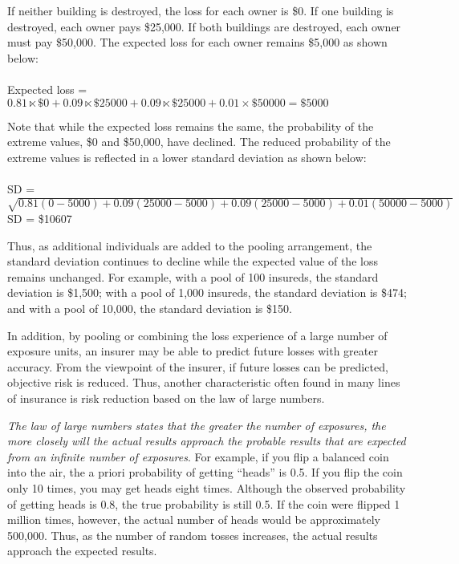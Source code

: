 If neither building is destroyed, the loss for each owner is \$0. If one building is destroyed, each owner pays \$25,000. If both buildings are destroyed, each owner must pay \$50,000. The expected loss for each owner remains \$5,000 as shown below:\\\\
Expected loss = $ 0.81 \ltimes \$0 + 0.09 \ltimes \$25000 + 0.09 \ltimes \$25000 + 0.01 \times \$50000 = \$5000$\\
\par
Note that while the expected loss remains the same, the probability of the extreme values, \$0 and \$50,000, have declined. The reduced probability of the extreme values is reflected in a lower standard deviation as shown below:\\\\
SD = $ \sqrt{0.81(0 - 5000) + 0.09(25000 - 5000) + 0.09(25000 - 5000) + 0.01(50000 -5000)}$\\
SD = \$10607\\
\par
Thus, as additional individuals are added to the pooling arrangement, the standard deviation continues to decline while the expected value of the loss remains unchanged. For example, with a pool of 100 insureds, the standard deviation is \$1,500; with a pool of 1,000 insureds, the standard deviation is \$474; and with a pool of 10,000, the standard deviation is \$150.\\
\par
In addition, by pooling or combining the loss experience of a large number of exposure units, an insurer may be able to predict future losses with greater accuracy. From the viewpoint of the insurer, if future losses can be predicted, objective risk is reduced. Thus, another characteristic often found in many lines of insurance is risk reduction based on the law of large numbers.\\
\par
\textit{The law of large numbers states that the greater the number of exposures, the more closely will the actual results approach the probable results that are expected from an infinite number of exposures}. For example, if you flip a balanced coin into the air, the a priori probability of getting “heads” is 0.5. If you flip the coin only 10 times, you may get heads eight times. Although the observed probability of getting heads is 0.8, the true probability is still 0.5. If the coin were flipped 1 million times, however, the actual number of heads would be approximately 500,000. Thus, as the number of random tosses increases, the actual results approach the expected results.
%
